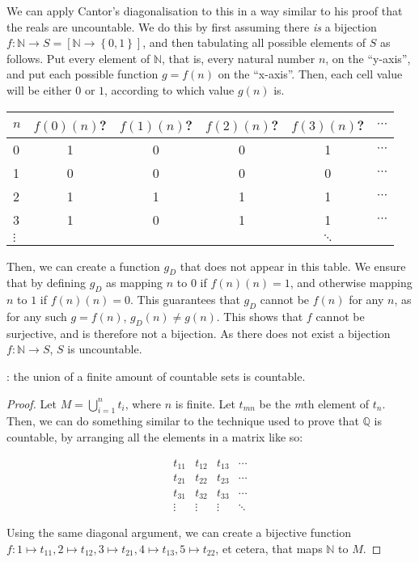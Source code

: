 
We can apply Cantor's diagonalisation to this in a way similar to his proof that the reals are uncountable. We do this by first assuming there \textit{is} a bijection $f: \mathbb{N} \rightarrow S = \left[ \mathbb{N} \rightarrow \left\{ 0, 1 \right\} \right]$, and then tabulating all possible elements of $S$ as follows. Put every element of $\mathbb{N}$, that is, every natural number $n$, on the ``y-axis'', and put each possible function $g = f(n)$ on the ``x-axis''. Then, each cell value will be either $0$ or $1$, according to which value $g(n)$ is.

\begin{center}
\begin{tabular}{lccccc}
$n$ & $f(0)(n)$? & $f(1)(n)$? & $f(2)(n)$? & $f(3)(n)$? & $\cdots$ \\ \hline
0   & 1 & 0 & 0 & 1 & $\cdots$ \\
1   & 0 & 0 & 0 & 0 & $\cdots$ \\
2   & 1 & 1 & 1 & 1 & $\cdots$ \\
3   & 1 & 0 & 1 & 1 & $\cdots$ \\
$\vdots$ & & & & $\ddots$ \\
\end{tabular}
\end{center}

Then, we can create a function $g_D$ that does not appear in this table. We ensure that by defining $g_D$ as mapping $n$ to $0$ if $f(n)(n) = 1$, and otherwise mapping $n$ to $1$ if $f(n)(n) = 0$. This guarantees that $g_D$ cannot be $f(n)$ for any $n$, as for any such $g = f(n)$, $g_D(n) \neq g(n)$. This shows that $f$ cannot be surjective, and is therefore not a bijection. As there does not exist a bijection $f: \mathbb{N} \rightarrow S$, $S$ is uncountable.


\lemma: the union of a finite amount of countable sets is countable.

\begin{proof}
Let $M = \bigcup_{i = 1}^n t_i$, where $n$ is finite. Let $t_{mn}$ be the \textit{m}th element of $t_n$. Then, we can do something similar to the technique used to prove that $\mathbb{Q}$ is countable, by arranging all the elements in a matrix like so:

$$
\begin{matrix}
  t_{11} & t_{12} & t_{13} & \cdots \\
  t_{21} & t_{22} & t_{23} & \cdots \\
  t_{31} & t_{32} & t_{33} & \cdots \\
  \vdots & \vdots & \vdots & \ddots
\end{matrix}
$$

Using the same diagonal argument, we can create a bijective function $f: 1 \mapsto t_{11}, 2 \mapsto t_{12}, 3 \mapsto t_{21}, 4 \mapsto t_{13}, 5 \mapsto t_{22}$, et cetera, that maps $\mathbb{N}$ to $M$.
\end{proof}

